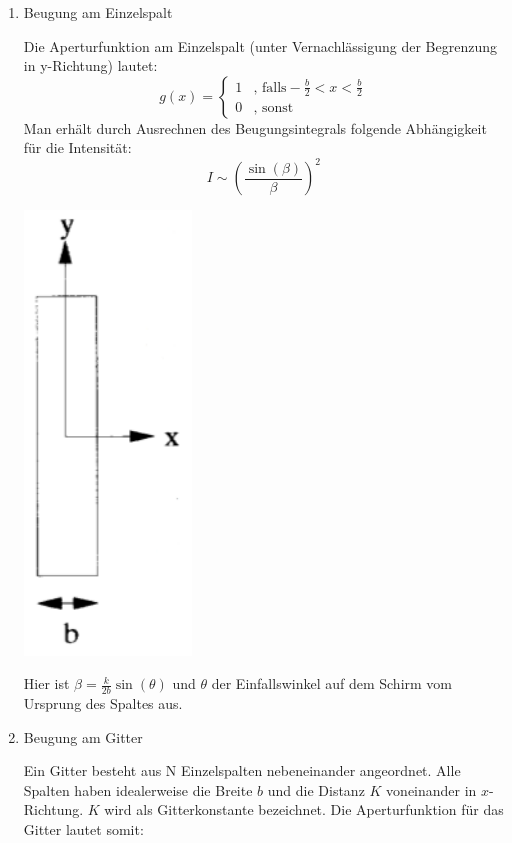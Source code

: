 \begin{enumerate}
 
\item Beugung am Einzelspalt


\begin{minipage}{0.6\textwidth}
Die Aperturfunktion am Einzelspalt (unter Vernachl\"assigung der Begrenzung in y-Richtung) lautet:
$$ g(x) = \begin{cases} 
	1 & \text{, falls} -\frac{b}{2}<x<\frac{b}{2}\\
	0 & \text{, sonst}
     \end{cases}$$
Man erh\"alt durch Ausrechnen des Beugungsintegrals folgende Abh\"angigkeit f\"ur die Intensit\"at:
$$ I \sim \left(\frac{\sin(\beta)}{\beta}\right)^2 $$
\end{minipage}
\begin{minipage}{0.4\textwidth}
	\begin{center}
		\includegraphics[width=0.35\textwidth]{Bilder/Einzelspalt.jpg}
	\end{center}
\end{minipage}

Hier ist $\beta = \frac{k}{2b}\sin(\theta)$ und $\theta$ der Einfallswinkel auf dem Schirm vom Ursprung des Spaltes aus.

\item Beugung am Gitter

\begin{minipage}{0.6\textwidth}
Ein Gitter besteht aus N Einzelspalten nebeneinander angeordnet. Alle Spalten haben idealerweise die Breite $b$ und die Distanz $K$ voneinander in $x$-Richtung. $K$ wird als Gitterkonstante bezeichnet. Die Aperturfunktion f\"ur das Gitter lautet somit:


\end{minipage}
\end{enumerate}
